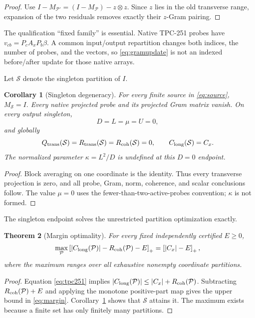 \documentclass[10pt]{article}
\newtheorem{theorem}{Theorem}
\newtheorem{corollary}[theorem]{Corollary}
\newcommand{\pos}[1]{\left[#1\right]_{+}}
\newcommand{\M}{M_{\mathcal P}}
\newcommand{\Mp}{M_{\mathcal P'}}
\begin{document}
\begin{proof}
Use $I-\Mp=(I-\M)-z\otimes z$.  Since $z$ lies in the old transverse
range, expansion of the two residuals removes exactly their $z$-Gram
pairing.
\end{proof}

The qualification ``fixed family'' is essential.  Native TPC-251 probes have
$v_{cb}=P_cA_xP_b\beta$.  A common input/output repartition changes both
indices, the number of probes, and the vectors, so \eqref{eq:gramupdate} is
not an indexed before/after update for those native arrays.

Let $\mathcal S$ denote the singleton partition of $I$.

\begin{corollary}[Singleton degeneracy]\label{cor:singleton}
For every finite source in \eqref{eq:source}, $M_{\mathcal S}=I$.  Every
native projected probe and its projected Gram matrix vanish.  On every output
singleton,
\[
 D=L=\mu=U=0,
\]
and globally
\begin{equation}\label{eq:singleton}
 Q_{\rm trans}(\mathcal S)=R_{\rm trans}(\mathcal S)
 =R_{\rm coh}(\mathcal S)=0,\qquad
 C_{\rm long}(\mathcal S)=C_x.
\end{equation}
The normalized parameter $\kappa=L^2/D$ is undefined at this $D=0$ endpoint.
\end{corollary}

\begin{proof}
Block averaging on one coordinate is the identity.  Thus every transverse
projection is zero, and all probe, Gram, norm, coherence, and scalar
conclusions follow.  The value $\mu=0$ uses the fewer-than-two-active-probes
convention; $\kappa$ is not formed.
\end{proof}

The singleton endpoint solves the unrestricted partition optimization
exactly.

\begin{theorem}[Margin optimality]\label{thm:margin}
For every fixed independently certified $E\geq0$,
\begin{equation}\label{eq:margin}
 \max_{\mathcal P}
 \pos{|C_{\rm long}(\mathcal P)|-R_{\rm coh}(\mathcal P)-E}
 =\pos{|C_x|-E},
\end{equation}
where the maximum ranges over all exhaustive nonempty coordinate partitions.
\end{theorem}

\begin{proof}
Equation \eqref{eq:tpc251} implies
$|C_{\rm long}(\mathcal P)|\leq |C_x|+R_{\rm coh}(\mathcal P)$.  Subtracting
$R_{\rm coh}(\mathcal P)+E$ and applying the monotone positive-part map gives
the upper bound in \eqref{eq:margin}.  Corollary~\ref{cor:singleton} shows
that $\mathcal S$ attains it.  The maximum exists because a finite set has
only finitely many partitions.
\end{proof}
\end{document}
